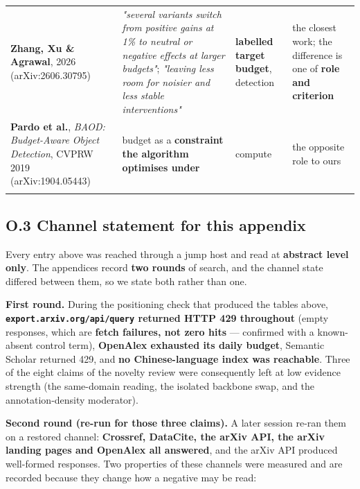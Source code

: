 \documentclass[pdflatex,sn-mathphys-ay]{sn-jnl}
\begin{document}
{\begin{longtable}{p{}p{}p{}p{}}
\textbf{Zhang, Xu \& Agrawal}, 2026 (arXiv:2606.30795) & \emph{"several variants switch from positive gains at 1\% to neutral or negative effects at larger budgets"}; \emph{"leaving less room for noisier and less stable interventions"} & \textbf{labelled target budget}, detection & the closest work; the difference is one of \textbf{role and criterion} \\
\textbf{Pardo et al.}, \emph{BAOD: Budget-Aware Object Detection}, CVPRW 2019 (arXiv:1904.05443) & budget as a \textbf{constraint the algorithm optimises under} & compute & the opposite role to ours \\
\botrule
\end{longtable}}

\subsection*{O.3 Channel statement for this appendix}

Every entry above was reached through a jump host and read at \textbf{abstract level only}. The appendices record \textbf{two rounds} of search, and the channel state differed between them, so we state both rather than one.

\textbf{First round.} During the positioning check that produced the tables above, \textbf{\texttt{export.arxiv.org/api/query} returned HTTP 429 throughout} (empty responses, which are \textbf{fetch failures, not zero hits} --- confirmed with a known-absent control term), \textbf{OpenAlex exhausted its daily budget}, Semantic Scholar returned 429, and \textbf{no Chinese-language index was reachable}. Three of the eight claims of the novelty review were consequently left at low evidence strength (the same-domain reading, the isolated backbone swap, and the annotation-density moderator).

\textbf{Second round (re-run for those three claims).} A later session re-ran them on a restored channel: \textbf{Crossref, DataCite, the arXiv API, the arXiv landing pages and OpenAlex all answered}, and the arXiv API produced well-formed responses. Two properties of these channels were measured and are recorded because they change how a negative may be read:
\end{document}

